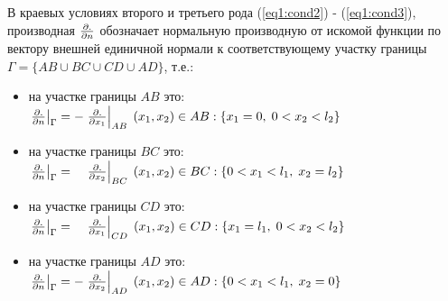 В краевых условиях второго и третьего рода (\ref{eq1:cond2}) - (\ref{eq1:cond3}), производная $ \frac{\partial .}{\partial n} $ обозначает нормальную производную от искомой функции по вектору внешней единичной нормали к соответствующему участку границы $ \Gamma = \{AB \cup BC \cup CD \cup AD \} $, т.е.:

\begin{itemize}
\item на участке границы $AB$ это: \; $ \left. \frac{\partial .}{\partial n} \right|_{\Gamma} = - \left. \frac{\partial .}{\partial x_{1}} \right|_{AB}
\; (x_{1},x_{2}) \in AB : \{ x_{1} = 0,\; 0 < x_{2} < l_{2} \}$
\item на участке границы $BC$ это: \; $ \left. \frac{\partial .}{\partial n} \right|_{\Gamma} = \phantom{-} \left. \frac{\partial .}{\partial x_{2}} \right|_{BC}
\; (x_{1},x_{2}) \in BC : \{ 0 < x_{1} < l_{1},\; x_{2} = l_{2} \}$
\item на участке границы $CD$ это: \; $ \left. \frac{\partial .}{\partial n} \right|_{\Gamma} = \phantom{-} \left. \frac{\partial .}{\partial x_{1}} \right|_{CD}
\; (x_{1},x_{2}) \in CD : \{ x_{1} = l_{1},\; 0 < x_{2} < l_{2} \}$
\item на участке границы $AD$ это: \; $ \left. \frac{\partial .}{\partial n} \right|_{\Gamma} = -\left. \frac{\partial .}{\partial x_{2}} \right|_{AD}
\; (x_{1},x_{2}) \in AD : \{ 0 < x_{1} < l_{1},\; x_{2} = 0 \}$
\end{itemize}
